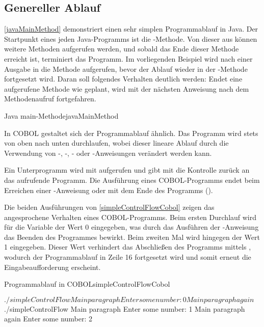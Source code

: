 \subsection{Genereller Ablauf} \label{generalablauf}

\autoref{javaMainMethod} demonstriert einen sehr simplen Programmablauf in Java. Der Startpunkt eines jeden Java-Programms ist die -Methode. Von dieser aus können weitere Methoden aufgerufen werden, und sobald das Ende dieser Methode erreicht ist, terminiert das Programm. Im vorliegenden Beispiel wird nach einer Ausgabe in  die Methode  aufgerufen, bevor der Ablauf wieder in der -Methode fortgesetzt wird. Daran soll folgendes Verhalten deutlich werden: Endet eine aufgerufene Methode wie geplant, wird mit der nächsten Anweisung nach dem Methodenaufruf fortgefahren. 

\begin{codeWithCaption}{Java main-Methode}{javaMainMethod}
 \cFollow
{}
\end{codeWithCaption}

In COBOL gestaltet sich der Programmablauf ähnlich. Das Programm wird stets von oben nach unten durchlaufen, wobei dieser lineare Ablauf \zB durch die Verwendung von -, -, - oder -Anweisungen verändert werden kann.

Ein Unterprogramm wird mit  aufgerufen und gibt mit  die Kontrolle zurück an das aufrufende Programm. Die Ausführung eines COBOL-Programms endet beim Erreichen einer -Anweisung oder mit dem Ende des Programms (). 

Die beiden Ausführungen von \autoref{simpleControlFlowCobol} zeigen das angesprochene Verhalten eines COBOL-Programms. Beim ersten Durchlauf wird für die Variable  der Wert 0 eingegeben, was durch das Ausführen der -Anweisung das Beenden des Programmes bewirkt. Beim zweiten Mal wird hingegen der Wert 1 eingegeben. Dieser Wert verhindert das Abschließen des Programms mittels , wodurch der Programmablauf in Zeile 16 fortgesetzt wird und somit erneut die Eingabeaufforderung erscheint.

\begin{codeWithCaption}{Programmablauf in COBOL}{simpleControlFlowCobol}
 \cFollow
\begin{shellwindow}
$ ./simpleControlFlow 
Main paragraph
Enter some number: 0
Main paragraph again
$ ./simpleControlFlow 
Main paragraph
Enter some number: 1 
Main paragraph again
Enter some number: 2
\end{shellwindow}
\end{codeWithCaption}

